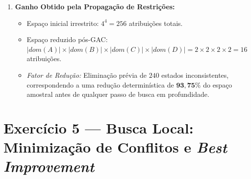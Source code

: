 \begin{enumerate}[label=(\alph*), resume]
    \item \textbf{Ganho Obtido pela Propagação de Restrições:}
    \begin{itemize}
        \item Espaço inicial irrestrito: $4^4 = 256$ atribuições totais.
        \item Espaço reduzido pós-GAC: $|dom(A)| \times |dom(B)| \times |dom(C)| \times |dom(D)| = 2 \times 2 \times 2 \times 2 = 16$ atribuições.
        \item \textit{Fator de Redução:} Eliminação prévia de $240$ estados inconsistentes, correspondendo a uma redução determinística de $\mathbf{93{,}75\%}$ do espaço amostral antes de qualquer passo de busca em profundidade.
    \end{itemize}
\end{enumerate}

\section{Exercício 5 — Busca Local: Minimização de Conflitos e \textit{Best Improvement}}

